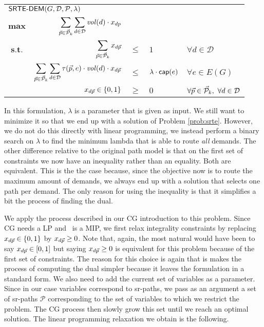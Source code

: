 \begin{center}
\begin{tabular}{crcll}
\multicolumn{5}{l}{$\displaystyle \textsf{SRTE-DEM}(G, \mathcal{D}, \mathcal{P}, \lambda)$} \\[0.5cm] 
$\displaystyle \mathbf{max}$ & $\displaystyle \sum_{\vec{p} \in \mathcal{\vec{P}}_k} \sum_{d \in \mathcal{D}} \mathit{vol}(d) \cdot x_{dp}$ & & & \\[0.5cm]
$\textbf{s.t.}$ & $\displaystyle \sum_{\vec{p} \in \mathcal{\vec{P}}_k} x_{d \vec{p}}$ & $\leq$ & $1$ & $\forall d \in \mathcal{D}$ \\[0.5cm] 
& $\displaystyle \sum_{\vec{p} \in \mathcal{\vec{P}}_k} \sum_{d \in \mathcal{D}} \tau(\vec{p}, e)  \cdot \mathit{vol}(d) \cdot x_{d \vec{p}}$ & $\leq$ & $\lambda \cdot \mathsf{cap}(e)$ & $\forall e \in E(G)$ \\[0.5cm] 
& $x_{d \vec{p}} \in \{0, 1\}$ & $\geq$ & $0$ & $\forall \vec{p} \in \mathcal{\vec{P}}_k, \ \forall d \in \mathcal{D}$
\end{tabular}
\end{center}



In this formulation, $\lambda$ is a parameter that is given as input. We still want to minimize it so that we end up with a solution of Problem \ref{prob:srte}. However, we do not do this directly with linear programming, we instead perform a binary search on $\lambda$ to find the minimum lambda that is able to route \emph{all} demands.
The other difference relative to the original path model is that on the first set of constraints we now have an inequality rather than an equality. Both are equivalent.
This is the the case because, since the objective now is to route the maximum amount of demands, we always end up with a solution that selects one path per demand. The only reason for using
the inequality is that it simplifies a bit the process of finding the dual.

We apply the process described in our CG introduction to this problem. Since CG needs a LP and \srtepathdem~is a MIP, we first relax integrality constraints  
by replacing $x_{d \vec{p}} \in \{ 0, 1 \}$ by $x_{d \vec{p}} \geq 0$. Note that, again, the most natural would have been to say $x_{d \vec{p}} \in [0, 1]$ but saying $x_{d \vec{p}} \geq 0$ is equivalent
for this problem because of the first set of constraints. The reason for this choice is again that is makes the process of computing the dual simpler because it leaves the 
formulation in a standard form. We also need to add the current set of variables as a parameter. Since in our case variables correspond to sr-paths, we pass
as an argument a set of sr-paths $\mathcal{P}$ corresponding to the set of variables to which we restrict the problem. The CG process then slowly grow this
set until we reach an optimal solution. The linear programming relaxation we obtain is the following.

